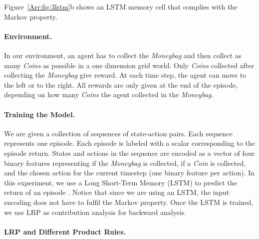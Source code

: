 \documentclass[runningheads]{llncs}
\begin{document}
Figure~\ref{Arr:fig:3lstm}b shows an LSTM memory cell that
complies with the Markov property.

\paragraph{Environment.}
In our environment, an agent has to collect the {\em Moneybag} and then collect as many {\em Coins} as possible in a one dimension grid world.
Only {\em Coins} collected after collecting the {\em Moneybag} give reward.
At each time step, the agent can move to the left or to the right.
All rewards are only given at the end of the episode,
depending on how many {\em Coins} the agent collected in the {\em Moneybag}.

\paragraph{Training the Model.}
We are given a collection of sequences of state-action pairs. Each sequence represents one episode. Each episode is labeled with a scalar corresponding to the episode return. States and actions in the sequence are encoded as a vector of four binary features representing if the {\em Moneybag} is collected, if a {\em Coin} is collected, and the chosen action for the current timestep (one binary feature per action). 
In this experiment, we use a Long Short-Term Memory (LSTM) \cite{Arr:Hochreiter:91,Arr:Hochreiter:97} 
to predict the return of an episode \cite{Arr:Arjona-Medina:18}. Notice that since we are using an LSTM, the input encoding does not have to fulfil the Markov property. Once the LSTM is trained, we use LRP \cite{Arr:Bach:15} as contribution analysis for backward analysis.  

\paragraph{LRP and Different Product Rules.}
\end{document}

